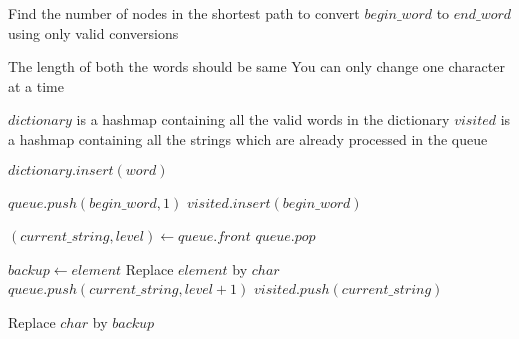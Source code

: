 \documentclass[12pt]{article}
\begin{document}
\begin{algorithm}
    
  \caption{Find the number of nodes in the shortest path to convert $begin\_word$ to $end\_word$ using only valid conversions}
  
  
  \begin{algorithmic}[1]
    \Statex
    \Require The length of both the words should be same
    \Ensure You can only change one character at a time
    
    \Statex
        \LeftComment $dictionary$ is a hashmap containing all the valid words in the dictionary 
        \LeftComment $visited$ is a hashmap containing all the strings which are already processed in the queue
        
        \Statex
            \State $dictionary.insert(word)$
        \EndFor
        
        \State $queue.push(begin\_word, 1)$
        \State $visited.insert(begin\_word)$
        
         
            \State $(current\_string, level) \gets queue.front$
            \State $queue.pop$
            
                \State {}
            \EndIf
            
                    \State $backup \gets element$
                    \State Replace $element$ by $char$ 
                            \State $queue.push(current\_string, level + 1)$
                            \State $visited.push(current\_string)$
                        \EndIf
                    \EndIf
                    
                    \State Replace $char$ by $backup$ 
                \EndFor
            \EndFor
        \EndWhile
        
        \State {}
    \EndFunction
  \end{algorithmic}
  
\end{algorithm}
\end{document}
